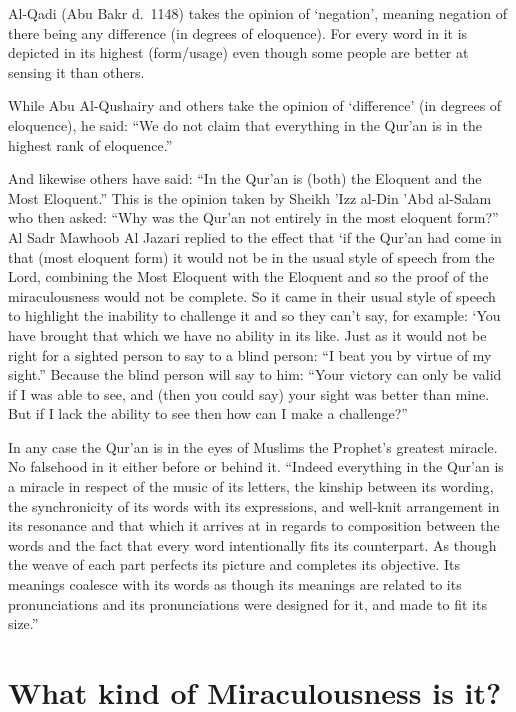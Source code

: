 \documentclass[12pt]{book}
\begin{document}
Al-Qadi (Abu Bakr d.\ 1148) takes the opinion of ‘negation’, meaning negation
of there being any difference (in degrees of eloquence). For every word in it
is depicted in its highest (form/usage) even though some people are better at
sensing it than others.

While Abu Al-Qushairy and others take the opinion of ‘difference’ (in degrees
of eloquence), he said: “We do not claim that everything in the Qur’an is in
the highest rank of eloquence.”

And likewise others have said: “In the Qur’an is (both) the Eloquent and the
Most Eloquent.” This is the opinion taken by Sheikh ’Izz al-Din ’Abd al-Salam
who then asked: “Why was the Qur’an not entirely in the most eloquent form?”
Al Sadr Mawhoob Al Jazari replied to the effect that ‘if the Qur’an had come in
that (most eloquent form) it would not be in the usual style of speech from the
Lord, combining the Most Eloquent with the Eloquent and so the proof of the
miraculousness would not be complete. So it came in their usual style of speech
to highlight the inability to challenge it and so they can’t say, for example:
‘You have brought that which we have no ability in its like. Just as it would
not be right for a sighted person to say to a blind person: “I beat you by
virtue of my sight.” Because the blind person will say to him: “Your victory
can only be valid if I was able to see, and (then you could say) your sight was
better than mine. But if I lack the ability to see then how can I make a
challenge?”\footnotemark


In any case the Qur’an is in the eyes of Muslims the Prophet’s greatest
miracle. No falsehood in it either before or behind it. “Indeed everything in
the Qur’an is a miracle in respect of the music of its letters, the kinship
between its wording, the synchronicity of its words with its expressions,
and well-knit arrangement in its resonance and that which it arrives at in
regards to composition between the words and the fact that every word
intentionally fits its counterpart. As though the weave of each part perfects
its picture and completes its objective. Its meanings coalesce with its
words as though its meanings are related to its pronunciations and its
pronunciations were designed for it, and made to fit its size.”\footnotemark



\section{What kind of Miraculousness is it?}
\end{document}
